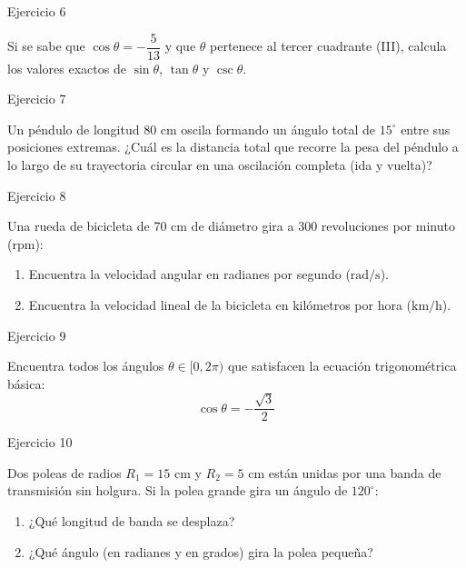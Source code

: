 \documentclass[aspectratio=169]{beamer}
\begin{document}
\begin{frame}{Ejercicio 6}
  \begin{mwejercicio}
    Si se sabe que $\cos\theta = -\dfrac{5}{13}$ y que $\theta$ pertenece al tercer cuadrante (III), calcula los valores exactos de $\sin\theta$, $\tan\theta$ y $\csc\theta$.
  \end{mwejercicio}
  \vspace{3.5cm}
\end{frame}
\begin{frame}{Ejercicio 7}
  \begin{mwejercicio}
    Un péndulo de longitud 80 cm oscila formando un ángulo total de $15^\circ$ entre sus posiciones extremas. ¿Cuál es la distancia total que recorre la pesa del péndulo a lo largo de su trayectoria circular en una oscilación completa (ida y vuelta)?
  \end{mwejercicio}
  \vspace{3.5cm}
\end{frame}
\begin{frame}{Ejercicio 8}
  \begin{mwejercicio}
    Una rueda de bicicleta de 70 cm de diámetro gira a 300 revoluciones por minuto (rpm):
    \begin{enumerate}
      \item Encuentra la velocidad angular en radianes por segundo ($\text{rad/s}$).
      \item Encuentra la velocidad lineal de la bicicleta en kilómetros por hora ($\text{km/h}$).
    \end{enumerate}
  \end{mwejercicio}
  \vspace{3.5cm}
\end{frame}
\begin{frame}{Ejercicio 9}
  \begin{mwejercicio}
    Encuentra todos los ángulos $\theta \in [0, 2\pi)$ que satisfacen la ecuación trigonométrica básica:
    $$\cos\theta = -\frac{\sqrt{3}}{2}$$
  \end{mwejercicio}
  \vspace{3.5cm}
\end{frame}
\begin{frame}{Ejercicio 10}
  \begin{mwejercicio}
    Dos poleas de radios $R_1 = 15\text{ cm}$ y $R_2 = 5\text{ cm}$ están unidas por una banda de transmisión sin holgura. Si la polea grande gira un ángulo de $120^\circ$:
    \begin{enumerate}
      \item ¿Qué longitud de banda se desplaza?
      \item ¿Qué ángulo (en radianes y en grados) gira la polea pequeña?
    \end{enumerate}
  \end{mwejercicio}
  \vspace{3.5cm}
\end{frame}
\end{document}
